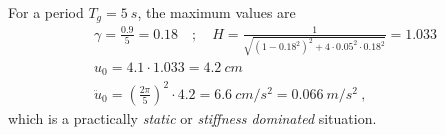 \begin{Answer}[ref={frame_ground_acceleration}]
For a period $T_g=\SI{5}{s}$, the maximum values are
\begin{align*}
&\gamma = \frac{0.9}{5} = 0.18 \quad ; \quad
H = \frac{1}{\sqrt{(1-0.18^2)^2 + 4\cdot 0.05^2\cdot 0.18^2}} = 1.033 \\
&u_0 = 4.1\cdot 1.033 = \SI{4.2}{cm} \\
&\ddot{u}_0 = \left(\frac{2\pi}{5}\right)^2 \cdot 4.2 = \SI{6.6}{cm/s^2} = \SI{0.066}{m/s^2}\ ,
\end{align*}
which is a practically \emph{static} or \emph{stiffness dominated} situation.

\end{Answer}
